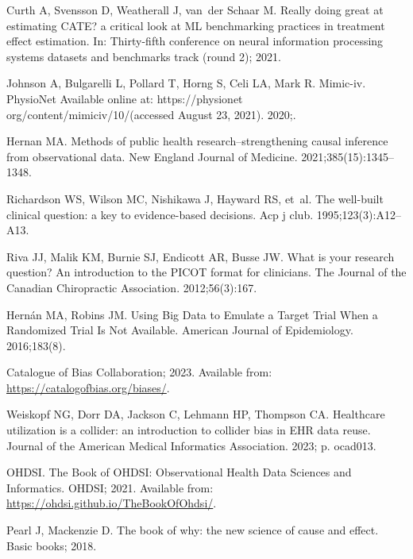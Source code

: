 \documentclass[10pt,letterpaper]{article}
\begin{document}
\begin{thebibliography}{100}
  Curth A, Svensson D, Weatherall J, van~der Schaar M.
  \newblock Really doing great at estimating CATE? a critical look at ML benchmarking practices in treatment effect estimation.
  \newblock In: Thirty-fifth conference on neural information processing systems datasets and benchmarks track (round 2); 2021.

  Johnson A, Bulgarelli L, Pollard T, Horng S, Celi LA, Mark R.
  \newblock Mimic-iv.
  \newblock PhysioNet Available online at: https://physionet org/content/mimiciv/10/(accessed August 23, 2021). 2020;.

  Hernan MA.
  \newblock Methods of public health research--strengthening causal inference from observational data.
  \newblock New England Journal of Medicine. 2021;385(15):1345--1348.

  Richardson WS, Wilson MC, Nishikawa J, Hayward RS, et~al.
  \newblock The well-built clinical question: a key to evidence-based decisions.
  \newblock Acp j club. 1995;123(3):A12--A13.

  Riva JJ, Malik KM, Burnie SJ, Endicott AR, Busse JW.
  \newblock What is your research question? An introduction to the PICOT format for clinicians.
  \newblock The Journal of the Canadian Chiropractic Association. 2012;56(3):167.

  Hernán MA, Robins JM.
  \newblock Using {Big} {Data} to {Emulate} a {Target} {Trial} {When} a {Randomized} {Trial} {Is} {Not} {Available}.
  \newblock American Journal of Epidemiology. 2016;183(8).

  Catalogue of Bias Collaboration; 2023.
  \newblock Available from: \url{https://catalogofbias.org/biases/}.

  Weiskopf NG, Dorr DA, Jackson C, Lehmann HP, Thompson CA.
  \newblock Healthcare utilization is a collider: an introduction to collider bias in EHR data reuse.
  \newblock Journal of the American Medical Informatics Association. 2023; p. ocad013.

  OHDSI.
  \newblock The Book of OHDSI: Observational Health Data Sciences and Informatics.
  \newblock OHDSI; 2021.
  \newblock Available from: \url{https://ohdsi.github.io/TheBookOfOhdsi/}.

  Pearl J, Mackenzie D.
  \newblock The book of why: the new science of cause and effect.
  \newblock Basic books; 2018.


\end{thebibliography}
\end{document}
